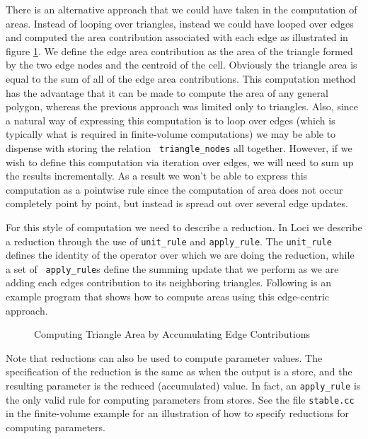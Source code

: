 \documentclass[10pt,epsf]{book}
\begin{document}
There is an alternative approach that we could have taken in the
computation of areas.  Instead of looping over triangles, instead we
could have looped over edges and computed the area contribution
associated with each edge as illustrated in figure \ref{fig:area}.  We
define the edge area contribution as the area of the triangle formed
by the two edge nodes and the centroid of the cell.  Obviously the
triangle area is equal to the sum of all of the edge area
contributions.  This computation method has the advantage that it can
be made to compute the area of any general polygon, whereas the
previous approach was limited only to triangles.  Also, since a
natural way of expressing this computation is to loop over edges
(which is typically what is required in finite-volume computations) we
may be able to dispense with storing the relation {\tt
  triangle\_nodes} all together.  However, if we wish to define this
computation via iteration over edges, we will need to sum up the
results incrementally.  As a result we won't be able to express this
computation as a pointwise rule since the computation of area does not
occur completely point by point, but instead is spread out over
several edge updates.

For this style of computation we need to describe a reduction.  In
Loci we describe a reduction through the use of {\tt unit\_rule} and
{\tt apply\_rule}.  The {\tt unit\_rule} defines the identity of the
operator over which we are doing the reduction, while a set of {\tt
  apply\_rule}s define the summing update that we perform as we are
adding each edges contribution to its neighboring triangles.
Following is an example program that shows how to compute areas using
this edge-centric approach.

\begin{figure}[h]
\centerline{
\epsfxsize=3.2in
}
\caption{Computing Triangle Area by Accumulating Edge Contributions}
\label{fig:area}
\end{figure}

Note that reductions can also be used to compute parameter values.
The specification of the reduction is the same as when the output is
a store, and the resulting parameter is the reduced (accumulated)
value.  In fact, an {\tt apply\_rule} is the only valid rule for
computing parameters from stores.  See the file {\tt stable.cc} in the
finite-volume example for an illustration of how to specify reductions
for computing parameters.


\end{document}
